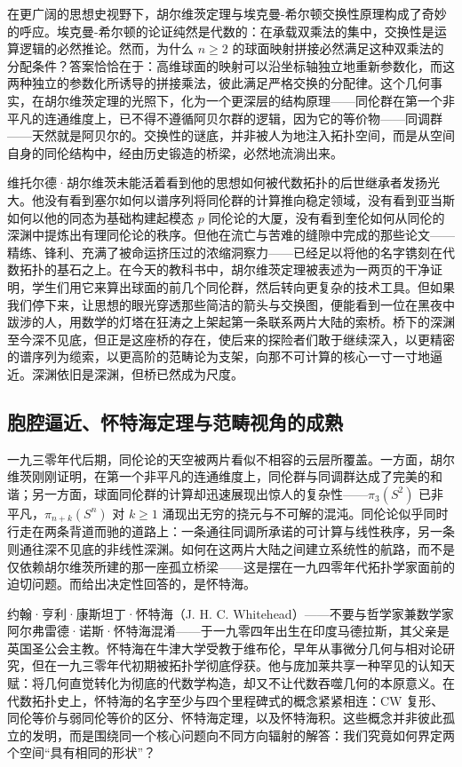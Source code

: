 \documentclass[12pt,a4paper]{article}
\begin{document}
在更广阔的思想史视野下，胡尔维茨定理与埃克曼-希尔顿交换性原理构成了奇妙的呼应。埃克曼-希尔顿的论证纯然是代数的：在承载双乘法的集中，交换性是运算逻辑的必然推论。然而，为什么 $n \geq 2$ 的球面映射拼接必然满足这种双乘法的分配条件？答案恰恰在于：高维球面的映射可以沿坐标轴独立地重新参数化，而这两种独立的参数化所诱导的拼接乘法，彼此满足严格交换的分配律。这个几何事实，在胡尔维茨定理的光照下，化为一个更深层的结构原理——同伦群在第一个非平凡的连通维度上，已不得不遵循阿贝尔群的逻辑，因为它的等价物——同调群——天然就是阿贝尔的。交换性的谜底，并非被人为地注入拓扑空间，而是从空间自身的同伦结构中，经由历史锻造的桥梁，必然地流淌出来。

维托尔德·胡尔维茨未能活着看到他的思想如何被代数拓扑的后世继承者发扬光大。他没有看到塞尔如何以谱序列将同伦群的计算推向稳定领域，没有看到亚当斯如何以他的同态为基础构建起模态 $p$ 同伦论的大厦，没有看到奎伦如何从同伦的深渊中提炼出有理同伦论的秩序。但他在流亡与苦难的缝隙中完成的那些论文——精练、锋利、充满了被命运挤压过的浓缩洞察力——已经足以将他的名字镌刻在代数拓扑的基石之上。在今天的教科书中，胡尔维茨定理被表述为一两页的干净证明，学生们用它来算出球面的前几个同伦群，然后转向更复杂的技术工具。但如果我们停下来，让思想的眼光穿透那些简洁的箭头与交换图，便能看到一位在黑夜中跋涉的人，用数学的灯塔在狂涛之上架起第一条联系两片大陆的索桥。桥下的深渊至今深不见底，但正是这座桥的存在，使后来的探险者们敢于继续深入，以更精密的谱序列为缆索，以更高阶的范畴论为支架，向那不可计算的核心一寸一寸地逼近。深渊依旧是深渊，但桥已然成为尺度。

\subsection{胞腔逼近、怀特海定理与范畴视角的成熟}


一九三零年代后期，同伦论的天空被两片看似不相容的云层所覆盖。一方面，胡尔维茨刚刚证明，在第一个非平凡的连通维度上，同伦群与同调群达成了完美的和谐；另一方面，球面同伦群的计算却迅速展现出惊人的复杂性——$\pi_3(S^2)$ 已非平凡，$\pi_{n+k}(S^n)$ 对 $k\geq 1$ 涌现出无穷的挠元与不可解的混沌。同伦论似乎同时行走在两条背道而驰的道路上：一条通往同调所承诺的可计算与线性秩序，另一条则通往深不见底的非线性深渊。如何在这两片大陆之间建立系统性的航路，而不是仅依赖胡尔维茨所建的那一座孤立桥梁——这是摆在一九四零年代拓扑学家面前的迫切问题。而给出决定性回答的，是怀特海。

约翰·亨利·康斯坦丁·怀特海（J. H. C. Whitehead）——不要与哲学家兼数学家阿尔弗雷德·诺斯·怀特海混淆——于一九零四年出生在印度马德拉斯，其父亲是英国圣公会主教。怀特海在牛津大学受教于维布伦，早年从事微分几何与相对论研究，但在一九三零年代初期被拓扑学彻底俘获。他与庞加莱共享一种罕见的认知天赋：将几何直觉转化为彻底的代数学构造，却又不让代数吞噬几何的本原意义。在代数拓扑史上，怀特海的名字至少与四个里程碑式的概念紧紧相连：CW 复形、同伦等价与弱同伦等价的区分、怀特海定理，以及怀特海积。这些概念并非彼此孤立的发明，而是围绕同一个核心问题向不同方向辐射的解答：我们究竟如何界定两个空间“具有相同的形状”？
\end{document}
